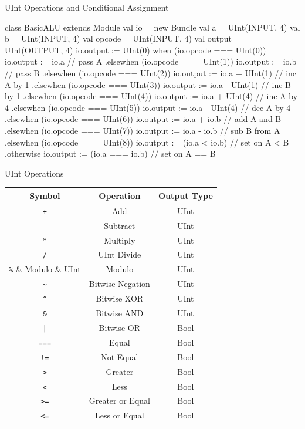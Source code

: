 \documentclass[xcolor=pdflatex,dvipsnames,table]{beamer}
\begin{document}
\begin{frame}[fragile]{UInt Operations and Conditional Assignment}

{
\begin{scala}
class BasicALU extends Module {
  val io = new Bundle {
    val a      = UInt(INPUT, 4)
    val b      = UInt(INPUT, 4)
    val opcode = UInt(INPUT, 4)
    val output = UInt(OUTPUT, 4)
  }
  io.output := UInt(0) 
  when (io.opcode === UInt(0)) {
    io.output := io.a                   // pass A
  } .elsewhen (io.opcode === UInt(1)) {
    io.output := io.b                   // pass B
  } .elsewhen (io.opcode === UInt(2)) {
    io.output := io.a + UInt(1)         // inc A by 1
  } .elsewhen (io.opcode === UInt(3)) {
    io.output := io.a - UInt(1)         // inc B by 1
  } .elsewhen (io.opcode === UInt(4)) {
    io.output := io.a + UInt(4)         // inc A by 4
  } .elsewhen (io.opcode === UInt(5)) {
    io.output := io.a - UInt(4)         // dec A by 4
  } .elsewhen (io.opcode === UInt(6)) {
    io.output := io.a + io.b            // add A and B
  } .elsewhen (io.opcode === UInt(7)) {
    io.output := io.a - io.b            // sub B from A
  } .elsewhen (io.opcode === UInt(8)) {
    io.output := (io.a < io.b)          // set on A < B
  } .otherwise { 
    io.output := (io.a === io.b)        // set on A == B
  }
}
\end{scala}
}

\end{frame}

\begin{frame}[fragile]{UInt Operations}

\begin{center}
\begin{tabular}{| c | c | c | }
\hline
Symbol & Operation & Output Type \\ \hline
\verb!+! & Add & UInt  \\ \hline
\verb+-+ & Subtract & UInt  \\ \hline
\verb+*+ & Multiply & UInt \\ \hline
\verb+/+ & UInt Divide & UInt \\ \hline
\verb+%+ & Modulo & UInt \\ \hline
\verb+~+ & Bitwise Negation & UInt \\ \hline
\verb+^+ & Bitwise XOR & UInt\\ \hline
\verb+&+ & Bitwise AND & UInt \\ \hline
\verb+|+ & Bitwise OR & Bool \\ \hline
\verb+===+ & Equal & Bool \\ \hline
\verb+!=+ & Not Equal & Bool \\ \hline
\verb+>+ & Greater & Bool \\ \hline
\verb+<+ & Less & Bool \\ \hline
\verb+>=+ & Greater or Equal & Bool \\ \hline
\verb+<=+ & Less or Equal & Bool \\ \hline
\end{tabular}
\end{center}

\end{frame}
\end{document}
